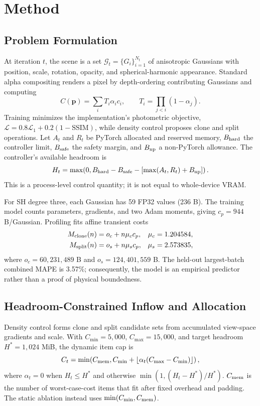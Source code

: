 \section{Method}
\subsection{Problem Formulation}
At iteration $t$, the scene is a set $\mathcal{G}_t=\{G_i\}_{i=1}^{N_t}$ of anisotropic Gaussians with position, scale, rotation, opacity, and spherical-harmonic appearance. Standard alpha compositing renders a pixel by depth-ordering contributing Gaussians and computing
\begin{equation}
  C(\mathbf{p})=\sum_{i} T_i\alpha_i c_i,\qquad
  T_i=\prod_{j<i}(1-\alpha_j).
\end{equation}
Training minimizes the implementation's photometric objective, $\mathcal{L}=0.8\mathcal{L}_1+0.2(1-\mathrm{SSIM})$, while density control proposes clone and split operations. Let $A_t$ and $R_t$ be PyTorch allocated and reserved memory, $B_{\rm hard}$ the controller limit, $B_{\rm safe}$ the safety margin, and $B_{\rm np}$ a non-PyTorch allowance. The controller's available headroom is
\begin{equation}
H_t=\max\!\left(0,B_{\rm hard}-B_{\rm safe}-[\max(A_t,R_t)+B_{\rm np}]\right).
\label{eq:headroom}
\end{equation}
This is a process-level control quantity; it is not equal to whole-device VRAM.

For SH degree three, each Gaussian has 59 FP32 values (236 B). The training model counts parameters, gradients, and two Adam moments, giving $c_p=944$ B/Gaussian. Profiling fits affine transient costs
\begin{align}
M_{\rm clone}(n)&=o_c+n\mu_c c_p, & \mu_c&=1.204584,\\
M_{\rm split}(n)&=o_s+n\mu_s c_p, & \mu_s&=2.573835,
\end{align}
where $o_c=60{,}231{,}489$ B and $o_s=124{,}401{,}559$ B. The held-out largest-batch combined MAPE is 3.57\%; consequently, the model is an empirical predictor rather than a proof of physical boundedness.

\subsection{Headroom-Constrained Inflow and Allocation}
Density control forms clone and split candidate sets from accumulated view-space gradients and scale. With $C_{\min}=5{,}000$, $C_{\max}=15{,}000$, and target headroom $H^*=1{,}024$ MiB, the dynamic item cap is
\begin{equation}
C_t=\min\!\left(C_{\rm mem},
C_{\min}+\left\lfloor\alpha_t(C_{\max}-C_{\min})\right\rfloor\right),
\end{equation}
where $\alpha_t=0$ when $H_t\le H^*$ and otherwise $\min(1,(H_t-H^*)/H^*)$. $C_{\rm mem}$ is the number of worst-case-cost items that fit after fixed overhead and padding. The static ablation instead uses $\min(C_{\min},C_{\rm mem})$.

